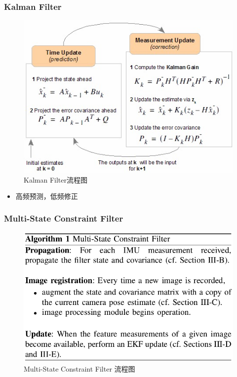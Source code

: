 \documentclass[12pt,a4paper]{article}
\begin{document}
\subsubsection{Kalman Filter}

\begin{figure}[H]
\centering
\includegraphics[scale=0.6]{images/kf_flow.jpg}
\caption{Kalman Filter流程图}
\end{figure}


\begin{itemize}
	\item 高频预测，低频修正
\end{itemize}


\subsubsection{Multi-State Constraint Filter}

\begin{figure}[H]
\centering
\includegraphics[scale=0.4]{images/msckf_algr.png}
\caption{Multi-State Constraint Filter 流程图}
\end{figure}
\end{document}
